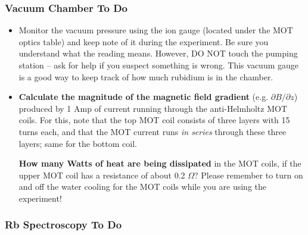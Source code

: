 \documentclass{../lab}
\begin{document}


\subsubsection{Vacuum Chamber To Do}

\begin{itemize}
    \item Monitor the vacuum pressure using the ion gauge (located under the MOT optics table) and keep note of it during the experiment. Be sure you understand what the reading means. However, DO NOT touch the pumping station – ask for help if you suspect something is wrong. This vacuum gauge is a good way to keep track of how much rubidium is in the chamber.

    \item \textbf{Calculate the magnitude of the magnetic field gradient} (e.g. $\partial B/\partial z$) produced by 1 Amp of current running through the anti-Helmholtz MOT coils. For this, note that the top MOT coil consists of three layers with 15 turns each, and that the MOT current runs \emph{in series} through these three layers; same for the bottom coil.

    \textbf{How many Watts of heat are being dissipated} in the MOT coils, if the upper MOT coil has a resistance of about 0.2 $\Omega$? Please remember to turn on and off the water cooling for the MOT coils while you are using the experiment!
    
\end{itemize}

\subsubsection{Rb Spectroscopy To Do}
\end{document}
